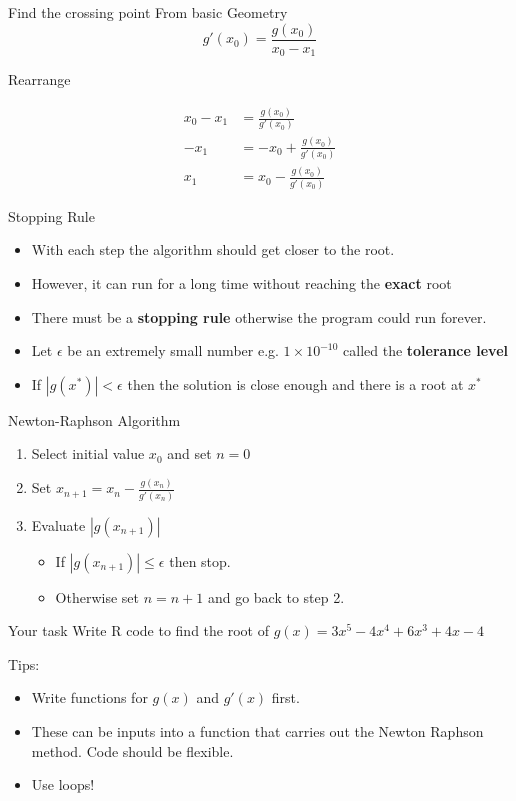 \documentclass[10pt]{beamer}
\begin{document}
\begin{frame}{Find the crossing point}
  From basic Geometry
  \begin{equation}
    g'(x_0)=\frac{g(x_0)}{x_0-x_1}
  \end{equation}

  Rearrange

  \begin{align}
    x_0-x_1&=\frac{g(x_0)}{g'(x_0)}\\
    -x_1&=-x_0+\frac{g(x_0)}{g'(x_0)}\\
    x_1&=x_0-\frac{g(x_0)}{g'(x_0)}
  \end{align}
\end{frame}
\begin{frame}{Stopping Rule}
  \begin{itemize}
  \item With each step the algorithm should get closer to the root.

  \item However, it can run for a long time without reaching the {\bf exact} root

  \item There must be a {\bf stopping rule} otherwise the program could run forever.

  \item  Let $\epsilon$ be an extremely small number e.g. $1\times 10^{-10}$ called the {\bf tolerance level}

  \item If $|g(x^*)|<\epsilon$ then the solution is close enough and there is a root at $x^*$
  \end{itemize}
\end{frame}
\begin{frame}{Newton-Raphson Algorithm}
  \begin{enumerate}
  \item Select initial value $x_0$ and set $n=0$
  \item Set $x_{n+1}=x_{n}-\frac{g(x_n)}{g'(x_n)}$
  \item Evaluate $|g(x_{n+1})|$
    \begin{itemize}
    \item If $|g(x_{n+1})|\leq\epsilon$ then stop.
    \item Otherwise set $n=n+1$ and go back to step 2.
    \end{itemize}
  \end{enumerate}
\end{frame}
\begin{frame}{Your task}
  Write R code to find the root of $g(x)=3x^5-4x^4+6x^3+4x-4$

  Tips:

  \begin{itemize}
  \item Write functions for $g(x)$ and $g'(x)$ first.

  \item These can be inputs into a function that carries out the Newton Raphson method.  Code should be flexible.

  \item Use loops!
  \end{itemize}
\end{frame}
\end{document}

